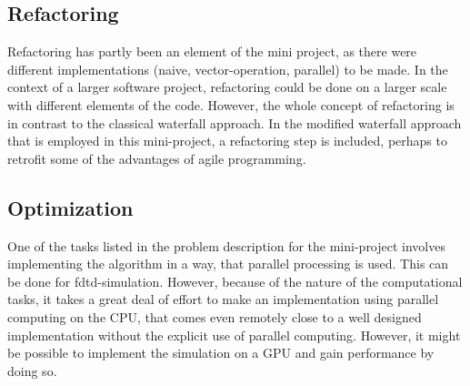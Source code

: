 \subsection{Refactoring}\label{ssec:refactoring}
Refactoring has partly been an element of the mini project, as there were different implementations (naive, vector-operation, parallel) to be made. 
In the context of a larger software project, refactoring could be done on a larger scale with different elements of the code. However, the whole concept of refactoring is in contrast to the classical waterfall approach. In the modified waterfall approach that is employed in this mini-project, a refactoring step is included, perhaps to retrofit some of the advantages of agile programming.
\subsection{Optimization}\label{ssec:optimization}
One of the tasks listed in the problem description for the mini-project involves implementing the algorithm in a way, that parallel processing is used. This can be done for \gls{fdtd}-simulation. However, because of the nature of the computational tasks, it takes a great deal of effort to make an implementation using parallel computing on the CPU, that comes even remotely close to a well designed implementation without the explicit use of parallel computing.
However, it might be possible to implement the simulation on a GPU and gain performance by doing so. 